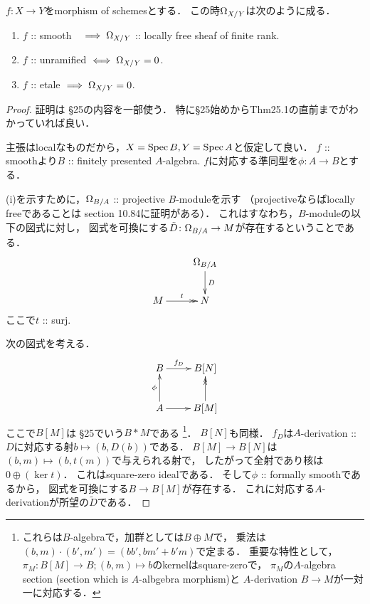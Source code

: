 \documentclass[a4paper]{jsarticle}
\begin{document}
\begin{Prop}
    $f \colon X \to Y$をmorphism of schemesとする．
    この時$\Omega_{X/Y}$は次のように成る．
\begin{enumerate}[label=(\roman*)]
    \item $f$ :: smooth \quad \ \,$\implies \Omega_{X/Y}$ :: locally free sheaf of finite rank.
    \item $f$ :: unramified $\iff \Omega_{X/Y}=0$.
    \item $f$ :: etale $\implies \Omega_{X/Y}=0$.
\end{enumerate}
\end{Prop}
\begin{proof}
    証明は\cite{Mat} \S 25の内容を一部使う．
    特に\S 25始めからThm25.1の直前までがわかっていれば良い．

    主張はlocalなものだから，$X=\operatorname{Spec} B, Y=\operatorname{Spec} A$と仮定して良い．
    $f$ :: smoothより$B$ :: finitely presented $A$-algebra.
    $f$に対応する準同型を$\phi \colon A \to B$とする．

    (i)を示すために，$\Omega_{B/A}$ :: projective $B$-moduleを示す
    （projectiveならばlocally freeであることは\cite{StacksProj} section 10.84に証明がある）．
    これはすなわち，$B$-moduleの以下の図式に対し，
    図式を可換にする$\tilde{D} \colon \Omega_{B/A} \to M$が存在するということである．
    \[\xymatrix{
        {} & \modDer_{B/A} \ar[d]^-{D}\\
        M \ar@{->>}[r]^-{t}& N
    }\]
    ここで$t$ :: surj.
    
    次の図式を考える．
    \[\xymatrix{
        B \ar[r]^-{f_D}& B[N] \\
        A \ar[r]\ar[u]^-{\phi}& B[M]\ar@{->>}[u]
    }\]
    ここで$B[M]$は\cite{Mat} \S 25でいう$B \ast M$である
    \footnote
    {
        これらは$B$-algebraで，加群としては$B \oplus M$で，
        乗法は$(b, m) \cdot (b', m')=(bb', bm'+b'm)$で定まる．
        重要な特性として，$\pi_M: B[M] \to B; (b, m) \mapsto b$のkernelはsquare-zeroで，
        $\pi_M$の$A$-algebra section (section which is $A$-albgebra morphism)と
        $A$-derivation $B \to M$が一対一に対応する．
    }．
    $B[N]$も同様．
    $f_D$は$A$-derivation :: $D$に対応する射$b \mapsto (b, D(b))$である．
    $B[M] \to B[N]$は$(b, m) \mapsto (b, t(m))$で与えられる射で，
    したがって全射であり核は$0 \oplus (\ker t)$．
    これはsquare-zero idealである．
    そして$\phi$ :: formally smoothであるから，
    図式を可換にする$B \to B[M]$が存在する．
    これに対応する$A$-derivationが所望の$\tilde{D}$である．


\end{proof}
\end{document}
